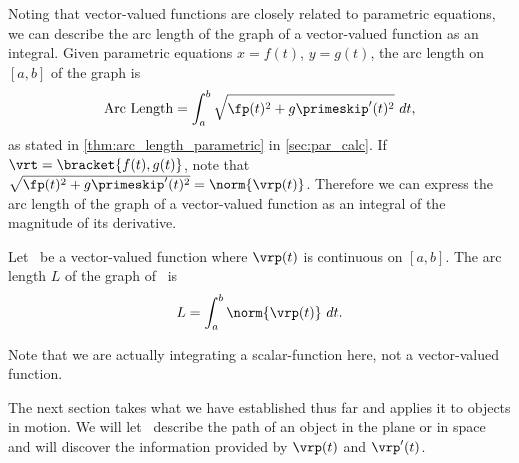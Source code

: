 Noting that vector-valued functions are closely related to parametric equations, we can describe the arc length of the graph of a vector-valued function as an integral. Given parametric equations $x=f(t)$, $y=g(t)$, the arc length on $[a,b]$ of the graph is
\[\text{Arc Length} = \int_a^b\sqrt{\fp(t)^2+g\primeskip'(t)^2}\ dt,\]
as stated in \autoref{thm:arc_length_parametric} in \autoref{sec:par_calc}. If $\vrt =\bracket{f(t), g(t)}$, note that $\sqrt{\fp(t)^2+g\primeskip'(t)^2} = \norm{\vrp(t)}$. Therefore we can express the arc length of the graph of a vector-valued function as an integral of the magnitude of its derivative.

{Let \vrt\ be a vector-valued function where $\vrp(t)$ is continuous on $[a,b]$. The arc length $L$ of the graph of \vrt\ is 
\[L = \int_a^b \norm{\vrp(t)}\ dt.\]}

Note that we are actually integrating a scalar-function here, not a vector-valued function.

The next section takes what we have established thus far and applies it to objects in motion. We will let \vrt\ describe the path of an object in the plane or in space and will discover the information provided by $\vrp(t)$ and $\vrp'(t)$.

